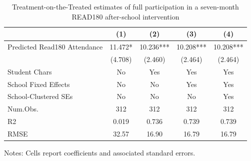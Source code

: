 \begin{table}
\centering
\caption{Treatment-on-the-Treated estimates of full participation in a seven-month READ180 after-school intervention \label{tab:tot}}
\centering
\begin{threeparttable}
\begin{tabular}[t]{lcccc}
\toprule
  & (1) & (2) & (3) & (4)\\
\midrule
Predicted Read180 Attendance & 11.472* & 10.236*** & 10.208*** & 10.208***\\
 & (4.708) & (2.460) & (2.464) & (2.464)\\
\midrule
Student Chars & No & Yes & Yes & Yes\\
School Fixed Effects & No & No & Yes & Yes\\
School-Clustered SEs & No & No & No & Yes\\
Num.Obs. & 312 & 312 & 312 & 312\\
R2 & 0.019 & 0.736 & 0.739 & 0.739\\
RMSE & 32.57 & 16.90 & 16.79 & 16.79\\
\bottomrule
\end{tabular}
\begin{tablenotes}
\item Notes: Cells report coefficients and associated standard errors.
\end{tablenotes}
\end{threeparttable}
\end{table}
